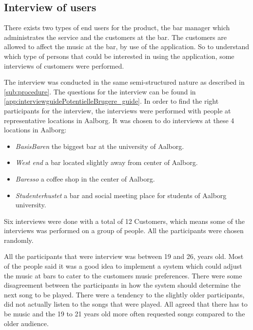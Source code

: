 \subsection{Interview of users}
\label{userInterviews}

There exists two types of end users for the product, the bar manager which administrates the service and the customers at the bar. The customers are allowed to affect the music at the bar, by use of the application. So to understand which type of persons that could be interested in using the application, some interviews of customers were performed.

The interview was conducted in the same semi-structured nature as described in \cref{sub:procedure}. The questions for the interview can be found in \cref{app:interviewguidePotentielleBrugere_guide}. In order to find the right participants for the interview, the interviews were performed with people at representative locations in Aalborg. It was chosen to do interviews at these 4 locations in Aalborg:

\begin{itemize}
    \item \emph{BasisBaren} the biggest bar at the university of Aalborg.
    \item \emph{West end} a bar located slightly away from center of Aalborg.
    \item \emph{Baresso} a coffee shop in the center of Aalborg.
    \item \emph{Studenterhustet} a bar and social meeting place for students of Aalborg university.
\end{itemize}

Six interviews were done with a total of 12 Customers, which means some of the interviews was performed on a group of people. All the participants were chosen randomly.

All the participants that were interview was between 19 and 26, years old. Most of the people said it was a good idea to implement a system which could adjust the music at bars to cater to the customers music preferences. There were some disagreement between the participants in how the system should determine the next song to be played. There were a tendency to the slightly older participants, did not actually listen to the songs that were played. All agreed that there has to be music and the 19 to 21 years old more often requested songs compared to the older audience.

